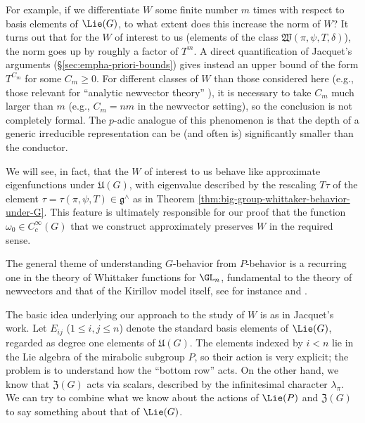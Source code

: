For example, if we differentiate $W$ some finite number $m$ times with respect to basis elements of $\Lie(G)$, to what extent does this increase the norm of $W$?  It turns out that for the $W$ of interest to us (elements of the class $\mathfrak{W}(\pi,\psi,T,\delta)$), the norm goes up by roughly a factor of $T^m$.  A direct quantification of Jacquet's arguments (\S\ref{sec:empha-priori-bounds}) gives instead an upper bound of the form $T^{C_m}$ for some $C_m \geq 0$.  For different classes of $W$ than those considered here (e.g., those relevant for ``analytic newvector theory'' \cite{JN19a, 2020arXiv200109640J}), it is necessary to take $C_m$ much larger than $m$ (e.g., $C_m = n m$ in the newvector setting), so the conclusion is not completely formal.  The $p$-adic analogue of this phenomenon is that the depth of a generic irreducible representation can be (and often is) significantly smaller than the conductor.

We will see, in fact, that the $W$ of interest to us behave like approximate eigenfunctions under $\mathfrak{U}(G)$, with eigenvalue described by the rescaling $T \tau$ of the element $\tau = \tau(\pi,\psi,T) \in \mathfrak{g}^\wedge$ as in Theorem \ref{thm:big-group-whittaker-behavior-under-G}.  This feature is ultimately responsible for our proof that the function $\omega_0 \in C_c^\infty(G)$ that we construct approximately preserves $W$ in the required sense.

The general theme of understanding $G$-behavior from $P$-behavior is a recurring one in the theory of Whittaker functions for $\GL_n$, fundamental to the theory of newvectors and that of the Kirillov model itself, see for instance \cite{MR620708, MR3138844, MR3001803} and \cite{MR0425030, MR0579172, MR748505,MR1999922}.

The basic idea underlying our approach to the study of $W$ is as in Jacquet's work.  Let $E_{i j}$ ($1 \leq i, j \leq n$) denote the standard basis elements of $\Lie(G)$, regarded as degree one elements of $\mathfrak{U}(G)$.  The elements indexed by $i < n$ lie in the Lie algebra of the mirabolic subgroup $P$, so their action is very explicit; the problem is to understand how the ``bottom row'' acts.  On the other hand, we know that $\mathfrak{Z}(G)$ acts via scalars, described by the infinitesimal character $\lambda_\pi$.  We can try to combine what we know about the actions of $\Lie(P)$ and $\mathfrak{Z}(G)$ to say something about that of $\Lie(G)$.

